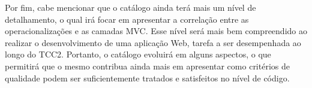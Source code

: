 Por fim, cabe mencionar que o catálogo ainda terá mais um nível de detalhamento, o qual irá focar em apresentar a correlação entre as operacionalizações e as camadas MVC. Esse nível será mais bem compreendido ao realizar o desenvolvimento de uma aplicação Web, tarefa a ser desempenhada ao longo do TCC2. Portanto, o catálogo evoluirá em alguns aspectos, o que permitirá que o mesmo contribua ainda mais em apresentar como critérios de qualidade podem ser suficientemente tratados e satisfeitos no nível de código.
